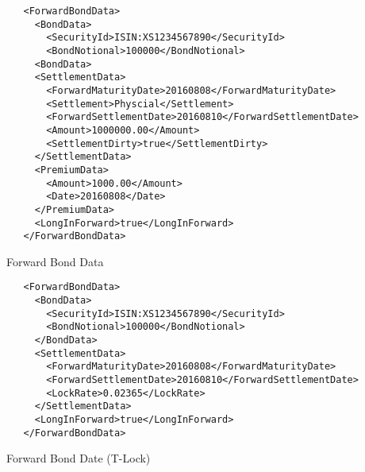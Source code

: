 \begin{listing}[H]
\begin{verbatim}
   <ForwardBondData>
     <BondData>
       <SecurityId>ISIN:XS1234567890</SecurityId>
       <BondNotional>100000</BondNotional>
     <BondData>
     <SettlementData>
       <ForwardMaturityDate>20160808</ForwardMaturityDate>
       <Settlement>Physcial</Settlement>
       <ForwardSettlementDate>20160810</ForwardSettlementDate>
       <Amount>1000000.00</Amount>
       <SettlementDirty>true</SettlementDirty>
     </SettlementData>
     <PremiumData>
       <Amount>1000.00</Amount>
       <Date>20160808</Date>
     </PremiumData>
     <LongInForward>true</LongInForward>
   </ForwardBondData>
\end{verbatim}
\caption{Forward Bond Data}
\label{lst:forward_bond_refdata}
\end{listing}

\begin{listing}[H]
   \begin{verbatim}
   <ForwardBondData>
     <BondData>
       <SecurityId>ISIN:XS1234567890</SecurityId>
       <BondNotional>100000</BondNotional>
     </BondData>
     <SettlementData>
       <ForwardMaturityDate>20160808</ForwardMaturityDate>
       <ForwardSettlementDate>20160810</ForwardSettlementDate>
       <LockRate>0.02365</LockRate>
     </SettlementData>
     <LongInForward>true</LongInForward>
   </ForwardBondData>
\end{verbatim}
\caption{Forward Bond Date (T-Lock)}
\label{lst:forward_bond_refdata_tlock}
\end{listing}
